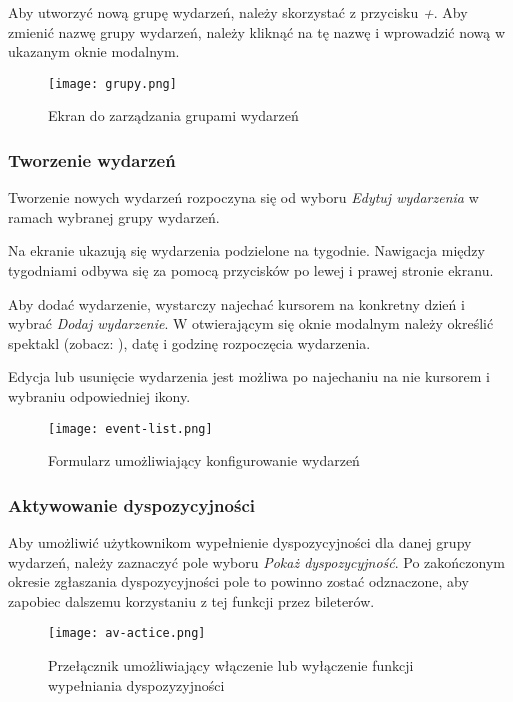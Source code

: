 \documentclass[shortabstract]{iithesis}
\begin{document}
Aby utworzyć nową grupę wydarzeń, należy skorzystać z przycisku \textit{+}. Aby zmienić nazwę grupy wydarzeń, należy kliknąć na tę nazwę i wprowadzić nową w ukazanym oknie modalnym.

\begin{figure}[h]
    \centering
    \texttt{[image: grupy.png]}
    \caption{Ekran do zarządzania grupami wydarzeń}
    \label{fig:grupy}
\end{figure}

\subsubsection{Tworzenie wydarzeń}

Tworzenie nowych wydarzeń rozpoczyna się od wyboru \textit{Edytuj wydarzenia} w ramach wybranej grupy wydarzeń.

Na ekranie ukazują się wydarzenia podzielone na tygodnie. Nawigacja między tygodniami odbywa się za pomocą przycisków po lewej i prawej stronie ekranu.

Aby dodać wydarzenie, wystarczy najechać kursorem na konkretny dzień i wybrać \textit{Dodaj wydarzenie}. W otwierającym się oknie modalnym należy określić spektakl (zobacz: ), datę i godzinę rozpoczęcia wydarzenia.

Edycja lub usunięcie wydarzenia jest możliwa po najechaniu na nie kursorem i wybraniu odpowiedniej ikony.

\begin{figure}[h]
    \centering
    \texttt{[image: event-list.png]}
    \caption{Formularz umożliwiający konfigurowanie wydarzeń}
    \label{fig:event-list}
\end{figure}

\subsubsection{Aktywowanie dyspozycyjności}

Aby umożliwić użytkownikom wypełnienie dyspozycyjności dla danej grupy wydarzeń, należy zaznaczyć pole wyboru \textit{Pokaż dyspozycyjność}. Po zakończonym okresie zgłaszania dyspozycyjności pole to powinno zostać odznaczone, aby zapobiec dalszemu korzystaniu z tej funkcji przez bileterów.

\begin{figure}[h]
    \centering
    \texttt{[image: av-actice.png]}
    \caption{Przełącznik umożliwiający włączenie lub wyłączenie funkcji wypełniania dyspozyzyjności}
    \label{fig:av-active}
\end{figure}
\end{document}
